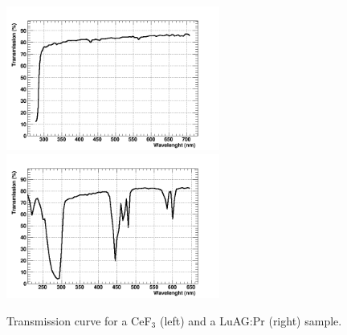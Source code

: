 \begin{figure}[htbp]
\begin{center}
\includegraphics[width=7cm]{../Pictures/Chapter_5/cef3_trans.png}
\includegraphics[width=7cm]{../Pictures/Chapter_5/luag_pr_trans.png}
\end{center}
\caption[Transmission curve for LuAG CeF$_{3}$]{Transmission curve for a CeF$_{3}$ (left) and a LuAG:Pr (right) sample.}
\label{fig:cef_pr_trans}
\end{figure}

